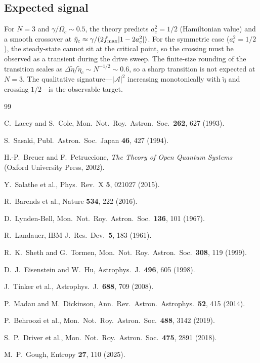 \documentclass[aps,prd,onecolumn]{revtex4-2}
\begin{document}
\subsection{Expected signal}

For $N=3$ and $\gamma/\Omega_c \sim 0.5$, the theory predicts $a_c^2 = 1/2$ (Hamiltonian value) and a smooth crossover at $\tilde{\eta}_c \approx \gamma/(2f_{\rm max}|1-2a_c^2|)$. For the symmetric case ($a_c^2 = 1/2$), the steady-state cannot sit at the critical point, so the crossing must be observed as a transient during the drive sweep. The finite-size rounding of the transition scales as $\Delta \tilde{\eta}/\tilde{\eta}_c \sim N^{-1/2} \sim 0.6$, so a sharp transition is not expected at $N=3$. The qualitative signature---$|\mathcal{A}|^2$ increasing monotonically with $\tilde{\eta}$ and crossing $1/2$---is the observable target.

\begin{thebibliography}{99}

C.~Lacey and S.~Cole, Mon.\ Not.\ Roy.\ Astron.\ Soc.\ \textbf{262}, 627 (1993).

S.~Sasaki, Publ.\ Astron.\ Soc.\ Japan \textbf{46}, 427 (1994).

H.-P.~Breuer and F.~Petruccione, \textit{The Theory of Open Quantum Systems} (Oxford University Press, 2002).

Y.~Salathe et al., Phys.\ Rev.\ X \textbf{5}, 021027 (2015).

R.~Barends et al., Nature \textbf{534}, 222 (2016).

D.~Lynden-Bell, Mon.\ Not.\ Roy.\ Astron.\ Soc.\ \textbf{136}, 101 (1967).

R.~Landauer, IBM J.\ Res.\ Dev.\ \textbf{5}, 183 (1961).

R.~K.~Sheth and G.~Tormen, Mon.\ Not.\ Roy.\ Astron.\ Soc.\ \textbf{308}, 119 (1999).

D.~J.~Eisenstein and W.~Hu, Astrophys.\ J.\ \textbf{496}, 605 (1998).

J.~Tinker et al., Astrophys.\ J.\ \textbf{688}, 709 (2008).

P.~Madau and M.~Dickinson, Ann.\ Rev.\ Astron.\ Astrophys.\ \textbf{52}, 415 (2014).

P.~Behroozi et al., Mon.\ Not.\ Roy.\ Astron.\ Soc.\ \textbf{488}, 3142 (2019).

S.~P.~Driver et al., Mon.\ Not.\ Roy.\ Astron.\ Soc.\ \textbf{475}, 2891 (2018).

M.~P.~Gough, Entropy \textbf{27}, 110 (2025).

\end{thebibliography}
\end{document}
